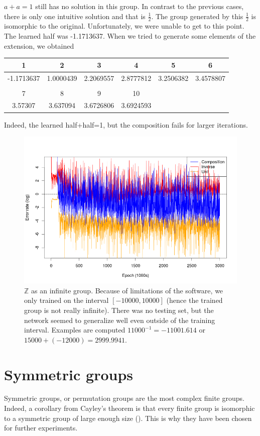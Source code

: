 $a+a=1$ still has no solution in this group. In contrast to the previous cases, there is only one intuitive solution and that is $\frac{1}{2}$. The group generated by this $\frac{1}{2}$ is isomorphic to the original. Unfortunately, we were unable to get to this point. The learned half was 
-1.1713637. When we tried to generate some elements of the extension, we obtained

\begin{tabular}{cccccc}
1&2&3&4&5&6\\
\hline
-1.1713637&1.0000439&2.2069557&2.8777812&3.2506382&3.4578807\\
 \\
7&8&9&10\\
\hline 
3.57307&3.637094&3.6726806&3.6924593
\end{tabular}

Indeed, the learned half+half=1, but the composition fails for larger iterations.
\begin{figure}
\caption{$\mathbb{Z}$ as an infinite group. Because of limitations of the software, we only trained on the interval $[-10000,10000]$ (hence the trained group is not really infinite). There was no testing set, but the network seemed to generalize well even outside of the training interval. Examples are computed $11000^{-1}=-11001.614$ or $15000+(-12000)=2999.9941$.}
\centering
\label{graph:z_inf}
\includegraphics[width=\linewidth]{../img/z_inf.png}
\end{figure}

\section{Symmetric groups}
Symmetric groups, or permutation groups are the most complex finite groups. Indeed, a corollary from Cayley's theorem  is that every finite group is isomorphic to a symmetric group of large enough size (\cite{cayley}). This is why they have been chosen for further experiments.

